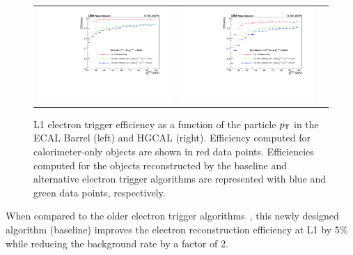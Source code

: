  \begin{figure}[tbh!]
 \begin{center}
  \begin{tabular}{ccc}
   \includegraphics[width=.45\linewidth]{figures/Part2/Upgrade/eff_barrel}&
   \includegraphics[width=.45\linewidth]{figures/Part2/Upgrade/eff_endcap}&
  \end{tabular}
  \caption{\ac{L1} electron trigger efficiency as a function of the particle $p_{\textsf{T}}$ in the \ac{ECAL} Barrel (left) and \ac{HGCAL} (right). Efficiency computed for calorimeter-only objects are shown in red data points. Efficiencies computed for the objects reconstructed by the baseline and alternative electron trigger algorithms are represented with blue and green data points, respectively.}
 \label{fig:eff_electron}
 \end{center}
\end{figure}

When compared to the older electron trigger algorithms~\cite{CMS:2017lum}, this newly designed algorithm (baseline) improves the electron reconstruction efficiency at \ac{L1} by 5\% while reducing the background rate by a factor of 2.  
